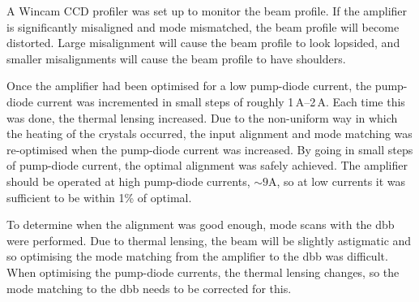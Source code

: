 \par
A Wincam CCD profiler was set up to monitor the beam profile. If the amplifier is significantly misaligned and mode mismatched, the beam profile will become distorted. Large misalignment will cause the beam profile to look lopsided, and smaller misalignments will cause the beam profile to have shoulders. 
\par
Once the amplifier had been optimised for a low pump-diode current, the pump-diode current was incremented in small steps of roughly 1\,A--2\,A. Each time this was done, the thermal lensing increased. Due to the non-uniform way in which the heating of the  crystals occurred, the input alignment and mode matching was re-optimised when the pump-diode current was increased. By going in small steps of pump-diode current, the optimal alignment was safely achieved. The amplifier should be operated at high pump-diode currents, $\sim\! 9\si{\ampere}$, so at low currents it was sufficient to be within 1\% of optimal. 
\par
To determine when the alignment was good enough, mode scans with the \gls{dbb} were performed. Due to thermal lensing, the beam will be slightly astigmatic and so optimising the mode matching from the amplifier to the \gls{dbb} was difficult. When optimising the pump-diode currents, the thermal lensing changes, so the mode matching to the \gls{dbb} needs to be corrected for this. 
